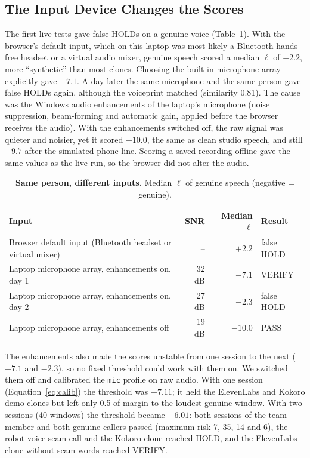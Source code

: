 \documentclass[10pt,a4paper,twocolumn]{article}
\newcommand{\llr}{\ell}
\begin{document}
\subsection{The Input Device Changes the Scores}
\label{sec:mic}
The first live tests gave false HOLDs on a genuine voice (Table~\ref{tab:mic}). With the browser's default input, which on this laptop was most likely a Bluetooth hands-free headset or a virtual audio mixer, genuine speech scored a median $\llr$ of $+2.2$, more ``synthetic'' than most clones. Choosing the built-in microphone array explicitly gave $-7.1$. A day later the same microphone and the same person gave false HOLDs again, although the voiceprint matched (similarity 0.81). The cause was the Windows audio enhancements of the laptop's microphone (noise suppression, beam-forming and automatic gain, applied before the browser receives the audio). With the enhancements switched off, the raw signal was quieter and noisier, yet it scored $-10.0$, the same as clean studio speech, and still $-9.7$ after the simulated phone line. Scoring a saved recording offline gave the same values as the live run, so the browser did not alter the audio.

\begin{table}[t]
\centering\footnotesize
\caption{\textbf{Same person, different inputs.} Median $\llr$ of genuine speech (negative = genuine).}
\label{tab:mic}
\setlength{\tabcolsep}{4pt}
\begin{tabular}{@{}p{}rrl@{}}
\toprule
\textbf{Input} & \textbf{SNR} & \textbf{Median $\llr$} & \textbf{Result}\\
\midrule
Browser default input (Bluetooth headset or virtual mixer) & -- & $+2.2$ & false HOLD\\
Laptop microphone array, enhancements on, day 1 & 32 dB & $-7.1$ & VERIFY\\
Laptop microphone array, enhancements on, day 2 & 27 dB & $-2.3$ & false HOLD\\
Laptop microphone array, enhancements off & 19 dB & $-10.0$ & PASS\\
\bottomrule
\end{tabular}
\end{table}

The enhancements also made the scores unstable from one session to the next ($-7.1$ and $-2.3$), so no fixed threshold could work with them on. We switched them off and calibrated the \texttt{mic} profile on raw audio. With one session (Equation~\ref{eq:calib}) the threshold was $-7.11$; it held the ElevenLabs and Kokoro demo clones but left only 0.5 of margin to the loudest genuine window. With two sessions (40 windows) the threshold became $-6.01$: both sessions of the team member and both genuine callers passed (maximum risk 7, 35, 14 and 6), the robot-voice scam call and the Kokoro clone reached HOLD, and the ElevenLabs clone without scam words reached VERIFY.
\end{document}
